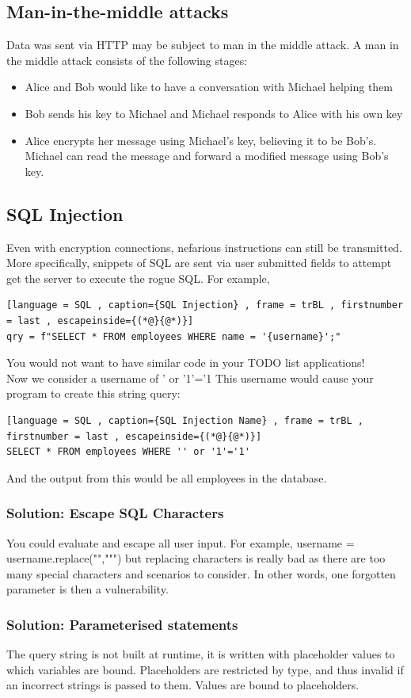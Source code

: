 \documentclass[a4paper]{article}
\theoremstyle{plain}
\theoremstyle{definition}
\theoremstyle{remark}
\begin{document}
\begin{flushleft}
\subsection{Man-in-the-middle attacks}
Data was sent via HTTP may be subject to man in the middle attack. A man in the middle attack consists of the following stages:
\begin{itemize}
	\item Alice and Bob would like to have a conversation with Michael helping them
	\item Bob sends his key to Michael and Michael responds to Alice with his own key
	\item Alice encrypts her message using Michael's key, believing it to be Bob's. Michael can read the message and forward a modified message using Bob's key.
\end{itemize}
\subsection{SQL Injection}
Even with encryption connections, nefarious instructions can still be transmitted. More specifically, snippets of SQL are sent via user submitted fields to attempt get the server to execute the rogue SQL. For example,
\begin{lstlisting}[language = SQL , caption={SQL Injection} , frame = trBL , firstnumber = last , escapeinside={(*@}{@*)}]
qry = f"SELECT * FROM employees WHERE name = '{username}';"
\end{lstlisting}
You would not want to have similar code in your TODO list applications! \\
Now we consider a username of ' or '1'='1
This username would cause your program to create this string query:
\begin{lstlisting}[language = SQL , caption={SQL Injection Name} , frame = trBL , firstnumber = last , escapeinside={(*@}{@*)}]
SELECT * FROM employees WHERE '' or '1'='1'
\end{lstlisting}
And the output from this would be all employees in the database.
\subsubsection{Solution: Escape SQL Characters}
You could evaluate and escape all user input. For example, username = username.replace("",""") but replacing characters is really bad as there are too many special characters and scenarios to consider. In other words, one forgotten parameter is then a vulnerability.
\subsubsection{Solution: Parameterised statements}
The query string is not built at runtime, it is written with placeholder values to which variables are bound. Placeholders are restricted by type, and thus invalid if an incorrect strings is passed to them. Values are bound to placeholders.

\end{flushleft}
\end{document}
